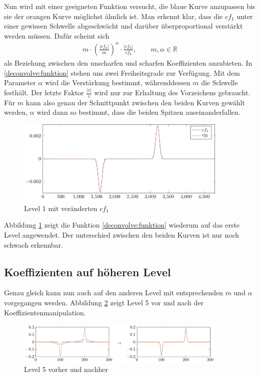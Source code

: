 Nun wird mit einer geeigneten Funktion versucht, die blaue Kurve anzupassen bis sie der orangen Kurve möglichst ähnlich ist.
Man erkennt klar, dass die $cf_1$ unter einer gewissen Schwelle abgeschwächt und darüber überproportional verstärkt werden müssen.
Dafür scheint sich
\begin{align}
m\cdot \left(\frac{|cf_k|}{m}\right)^{\alpha}\cdot \frac{|cf_k|}{cf_k}, \qquad m,\alpha\in\mathbb{R}
\label{deconvolve:funktion}
\end{align}
als Beziehung zwischen den \glqq unscharfen\grqq{} und \glqq scharfen\grqq{} Koeffizienten anzubieten.
In \eqref{deconvolve:funktion} stehen uns zwei Freiheitsgrade zur Verfügung.
Mit dem Parameter $\alpha$ wird die Verstärkung bestimmt, währenddessen $m$ die Schwelle festhält.
Der letzte Faktor $\frac{|c|}{c}$ wird nur zur Erhaltung des Vorzeichens gebraucht.
Für $m$ kann also genau der Schnittpunkt zwischen den beiden Kurven gewählt werden, $\alpha$ wird dann so bestimmt, dass die beiden Spitzen auseinanderfallen.
\begin{figure}[h]
\centering
\includegraphics[width=0.9\textwidth]{./papers/deconvolve/pictures/level/level1_n.pdf}
\caption{Level 1 mit veränderten $cf_1$\label{deconvolve:level1_n}}
\end{figure}

Abbildung \ref{deconvolve:level1_n} zeigt die Funktion \eqref{deconvolve:funktion} wiederum auf das erste Level angewendet.
Der unterschied zwischen den beiden Kurven ist nur noch schwach erkennbar.

\subsection{Koeffizienten auf höheren Level}
Genau gleich kann nun auch auf den anderen Level mit entsprechenden $m$ und $\alpha$ vorgegangen werden.
Abbildung \ref{deconvolve:level5} zeigt Level 5 vor und nach der Koeffizientenmanipulation.
\begin{figure}[h]
\centering
\includegraphics[width=0.9\textwidth]{./papers/deconvolve/pictures/level/level5.pdf}
\caption{Level 5 vorher und nachher\label{deconvolve:level5}}
\end{figure}

